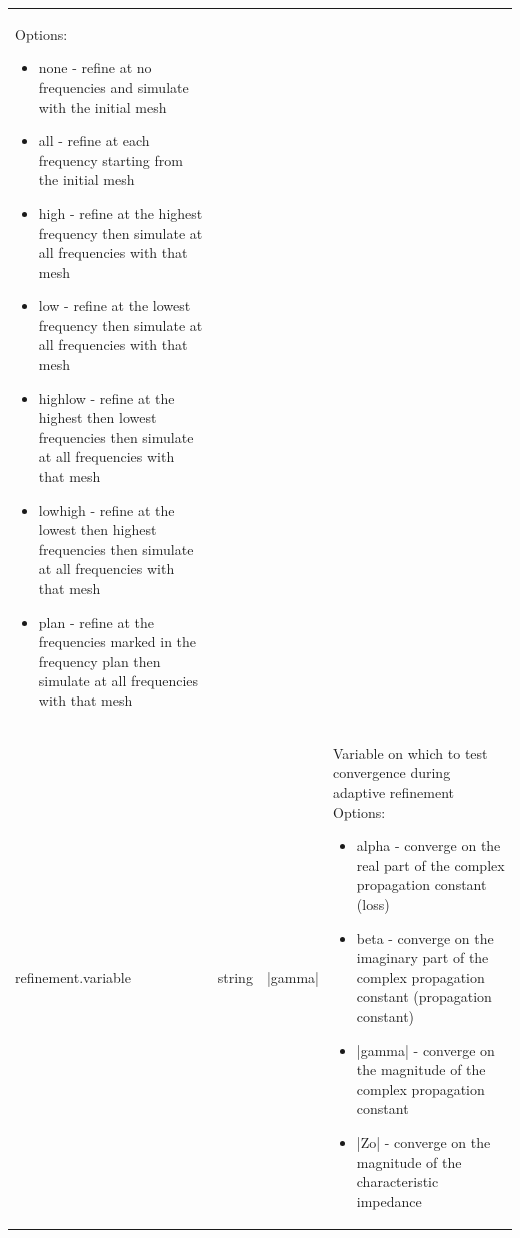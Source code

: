 \documentclass[titlepage]{article}
\renewcommand\_{\textunderscore\linebreak[1]}
\begin{document}
\begin{longtable}[c]{|lccp{8cm}|}
                                                   Options: 
                                                   \begin{itemize}[nosep]
                                                     \item none    - refine at no frequencies and simulate with the initial mesh
                                                     \item all     - refine at each frequency starting from the initial mesh
                                                     \item high    - refine at the highest frequency then simulate at all frequencies with that mesh
                                                     \item low     - refine at the lowest frequency then simulate at all frequencies with that mesh
                                                     \item highlow - refine at the highest then lowest frequencies then simulate at all frequencies with that mesh
                                                     \item lowhigh - refine at the lowest then highest frequencies then simulate at all frequencies with that mesh
                                                     \item plan    - refine at the frequencies marked in the frequency plan then simulate at all frequencies with that mesh
                                                   \end{itemize}\\ 
    refinement.variable           & string & |gamma| & Variable on which to test convergence during adaptive refinement
                                                   Options:
                                                   \begin{itemize}[nosep]
                                                     \item alpha   - converge on the real part of the complex propagation constant (loss)
                                                     \item beta    - converge on the imaginary part of the complex propagation constant (propagation constant)
                                                     \item |gamma| - converge on the magnitude of the complex propagation constant
                                                     \item |Zo|    - converge on the magnitude of the characteristic impedance

\end{itemize}
\end{longtable}
\end{document}
